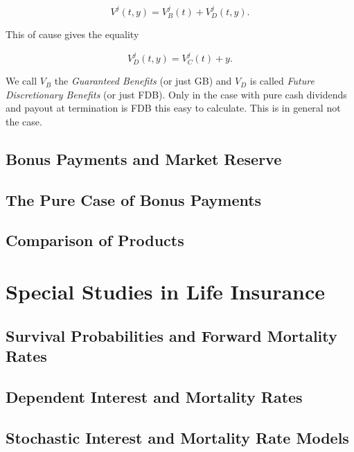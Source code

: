 \documentclass[
]{book}
\begin{document}
\[
V^j(t,y)=V_B^j(t)+V_D^j(t,y).
\]

This of cause gives the equality

\[
V_D^j(t,y)=V_C^j(t)+y.
\]

We call \(V_B\) the \emph{Guaranteed Benefits} (or just GB) and \(V_D\) is called \emph{Future Discretionary Benefits} (or just FDB). Only in the case with pure cash dividends and payout at termination is FDB this easy to calculate. This is in general not the case.

\hypertarget{bonus-payments-and-market-reserve}{%
\subsection{Bonus Payments and Market Reserve}\label{bonus-payments-and-market-reserve}}

\hypertarget{the-pure-case-of-bonus-payments}{%
\subsection{The Pure Case of Bonus Payments}\label{the-pure-case-of-bonus-payments}}

\hypertarget{comparison-of-products}{%
\subsection{Comparison of Products}\label{comparison-of-products}}

\hypertarget{special-studies-in-life-insurance}{%
\section{Special Studies in Life Insurance}\label{special-studies-in-life-insurance}}

\hypertarget{survival-probabilities-and-forward-mortality-rates-1}{%
\subsection{Survival Probabilities and Forward Mortality Rates}\label{survival-probabilities-and-forward-mortality-rates-1}}

\hypertarget{dependent-interest-and-mortality-rates}{%
\subsection{Dependent Interest and Mortality Rates}\label{dependent-interest-and-mortality-rates}}

\hypertarget{stochastic-interest-and-mortality-rate-models}{%
\subsection{Stochastic Interest and Mortality Rate Models}\label{stochastic-interest-and-mortality-rate-models}}
\end{document}
